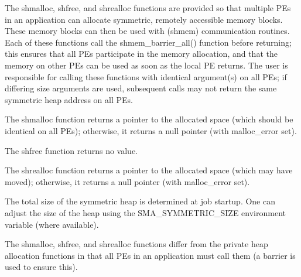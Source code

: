 {       The shmalloc, shfree, and shrealloc  functions  are  provided  so  that
       multiple	 PEs  in  an  application  can	allocate  symmetric,  remotely
       accessible memory blocks.  These memory blocks can then	be  used  with
       (shmem)	communication  routines.   Each	 of  these  functions call the
       shmem\_barrier\_all() function before returning; this ensures  that  all
       PEs  participate in the memory allocation, and that the memory on other
       PEs can be used	as  soon  as  the  local  PE  returns.	 The  user  is
       responsible  for	 calling these functions with identical argument(s) on
       all PEs; if differing size arguments are used, subsequent calls may not
       return the same symmetric heap address on all PEs.
}

{

		\desTB{}
		{
				\cRow{}{}
		}

		{
					 The shmalloc function returns a pointer to the allocated	 space	(which
					 should  be  identical on all PEs); otherwise, it returns a null pointer
					 (with malloc\_error set).

					 The shfree function returns no value.

					 The shrealloc function returns a pointer to the allocated space	(which
					 may   have   moved);   otherwise,  it  returns  a  null	pointer	 (with
					 malloc\_error set).
		}
}

{       The total size of the symmetric heap is determined at job startup.  One
       can  adjust  the	 size  of  the	heap  using   the   SMA\_SYMMETRIC\_SIZE
       environment  variable (where available).	

       The shmalloc, shfree, and shrealloc functions differ from  the  private
       heap  allocation	 functions in that all PEs in an application must call
       them (a barrier is used to ensure this).
}


%       
